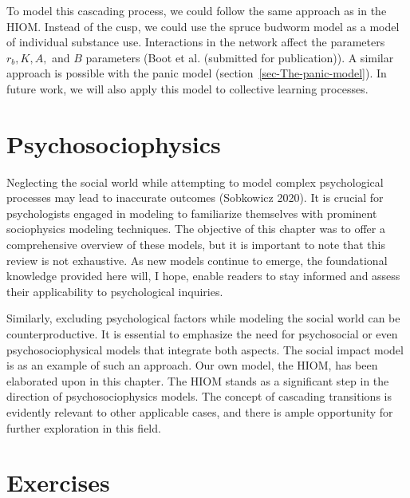 \documentclass[
  a4paper,
  DIV=11,
  numbers=noendperiod,
  oneside]{scrreprt}
\begin{document}
To model this cascading process, we could follow the same approach as in
the HIOM. Instead of the cusp, we could use the spruce budworm model as
a model of individual substance use. Interactions in the network affect
the parameters \(r_{b}, K, A,\) and \(B\) parameters (Boot et al.
(submitted for publication)). A similar approach is possible with the
panic model (section~\ref{sec-The-panic-model}). In future work, we will
also apply this model to collective learning processes.

\section{Psychosociophysics}\label{sec-Psychosociophysics}

Neglecting the social world while attempting to model complex
psychological processes may lead to inaccurate outcomes (Sobkowicz
2020). It is crucial for psychologists engaged in modeling to
familiarize themselves with prominent sociophysics modeling techniques.
The objective of this chapter was to offer a comprehensive overview of
these models, but it is important to note that this review is not
exhaustive. As new models continue to emerge, the foundational knowledge
provided here will, I hope, enable readers to stay informed and assess
their applicability to psychological inquiries.

Similarly, excluding psychological factors while modeling the social
world can be counterproductive. It is essential to emphasize the need
for psychosocial or even psychosociophysical models that integrate both
aspects. The social impact model is as an example of such an approach.
Our own model, the HIOM, has been elaborated upon in this chapter. The
HIOM stands as a significant step in the direction of psychosociophysics
models. The concept of cascading transitions is evidently relevant to
other applicable cases, and there is ample opportunity for further
exploration in this field.

\section{Exercises}\label{sec-Exercises-ch7}
\end{document}
